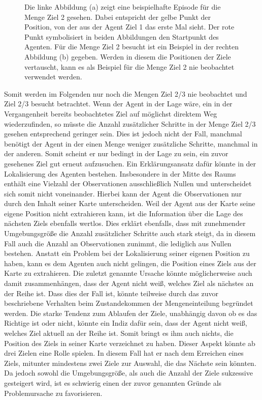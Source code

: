 \begin{figure}[ht!]
\begin{subfigure}[c]{0.5\textwidth}
		\subcaption{}
		\label{sample_visited}
	\end{subfigure}
	\caption{Die linke Abbildung (a) zeigt eine beispielhafte Episode für die Menge \glqq Ziel 2 gesehen\grqq{}. Dabei entspricht der gelbe Punkt der Position, von der aus der Agent Ziel 1 das erste Mal sieht. Der rote Punkt symbolisiert in beiden Abbildungen den Startpunkt des Agenten. Für die Menge \glqq Ziel 2 besucht\grqq{} ist ein Beispiel in der rechten Abbildung (b) gegeben. Werden in diesem die Positionen der Ziele vertauscht, kann es als Beispiel für die Menge \glqq Ziel 2 nie beobachtet\grqq{} verwendet werden.}
\end{figure}

Somit werden im Folgenden nur noch die Mengen \glqq Ziel 2/3 nie beobachtet\grqq{} und \glqq Ziel 2/3 besucht\grqq{} betrachtet. Wenn der Agent in der Lage wäre, ein in der Vergangenheit bereits beobachtetes Ziel auf möglichst direktem Weg wiederzufinden, so müsste die Anzahl zusätzlicher Schritte in der Menge \glqq Ziel 2/3 gesehen\grqq{} entsprechend geringer sein. Dies ist jedoch nicht der Fall, manchmal benötigt der Agent in der einen Menge weniger zusätzliche Schritte, manchmal in der anderen. Somit scheint er nur bedingt in der Lage zu sein, ein zuvor gesehenes Ziel gut erneut aufzusuchen. Ein Erklärungsansatz dafür könnte in der Lokalisierung des Agenten bestehen. Insbesondere in der Mitte des Raums enthält eine Vielzahl der Observationen ausschließlich Nullen und unterscheidet sich somit nicht voneinander. Hierbei kann der Agent die Observationen nur durch den Inhalt seiner Karte unterscheiden. Weil der Agent aus der Karte seine eigene Position nicht extrahieren kann, ist die Information über die Lage des nächsten Ziels ebenfalls wertlos. Dies erklärt ebenfalls, dass mit zunehmender Umgebungsgröße die Anzahl zusätzlicher Schritte auch stark steigt, da in diesem Fall auch die Anzahl an Observationen zunimmt, die lediglich aus Nullen bestehen. Anstatt ein Problem bei der Lokalisierung seiner eigenen Position zu haben, kann es dem Agenten auch nicht gelingen, die Position eines Ziels aus der Karte zu extrahieren. Die zuletzt genannte Ursache könnte möglicherweise auch damit zusammenhängen, dass der Agent nicht weiß, welches Ziel als nächstes an der Reihe ist. Dass dies der Fall ist, könnte teilweise durch das zuvor beschriebene Verhalten beim Zustandekommen der Mengeneinteilung begründet werden. Die starke Tendenz zum Ablaufen der Ziele, unabhängig davon ob es das Richtige ist oder nicht, könnte ein Indiz dafür sein, dass der Agent nicht weiß, welches Ziel aktuell an der Reihe ist. Somit bringt es ihm auch nichts, die Position des Ziels in seiner Karte verzeichnet zu haben. Dieser Aspekt könnte ab drei Zielen eine Rolle spielen. In diesem Fall hat er nach dem Erreichen eines Ziels, mitunter mindestens zwei Ziele zur Auswahl, die das Nächste sein könnten. Da jedoch sowohl die Umgebungsgröße, als auch die Anzahl der Ziele sukzessive gesteigert wird, ist es schwierig einen der zuvor genannten Gründe als Problemursache zu favorisieren.

